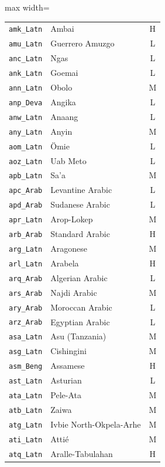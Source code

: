 {\begin{adjustbox}{max width=\textwidth}
\begin{tabular}{llc}
        \texttt{amk\_Latn} & Ambai & H \\
        \texttt{amu\_Latn} & Guerrero Amuzgo & L \\
        \texttt{anc\_Latn} & Ngas & L \\
        \texttt{ank\_Latn} & Goemai & L \\
        \texttt{ann\_Latn} & Obolo & M \\
        \texttt{anp\_Deva} & Angika & L \\
        \texttt{anw\_Latn} & Anaang & L \\
        \texttt{any\_Latn} & Anyin & M \\
        \texttt{aom\_Latn} & Ömie & L \\
        \texttt{aoz\_Latn} & Uab Meto & L \\
        \texttt{apb\_Latn} & Sa'a & M \\
        \texttt{apc\_Arab} & Levantine Arabic & L \\
        \texttt{apd\_Arab} & Sudanese Arabic & L \\
        \texttt{apr\_Latn} & Arop-Lokep & M \\
        \texttt{arb\_Arab} & Standard Arabic & H \\
        \texttt{arg\_Latn} & Aragonese & M \\
        \texttt{arl\_Latn} & Arabela & H \\
        \texttt{arq\_Arab} & Algerian Arabic & L \\
        \texttt{ars\_Arab} & Najdi Arabic & M \\
        \texttt{ary\_Arab} & Moroccan Arabic & L \\
        \texttt{arz\_Arab} & Egyptian Arabic & L \\
        \texttt{asa\_Latn} & Asu (Tanzania) & M \\
        \texttt{asg\_Latn} & Cishingini & M \\
        \texttt{asm\_Beng} & Assamese & H \\
        \texttt{ast\_Latn} & Asturian & L \\
        \texttt{ata\_Latn} & Pele-Ata & M \\
        \texttt{atb\_Latn} & Zaiwa & M \\
        \texttt{atg\_Latn} & Ivbie North-Okpela-Arhe & M \\
        \texttt{ati\_Latn} & Attié & M \\
        \texttt{atq\_Latn} & Aralle-Tabulahan & H \\

\end{tabular}
\end{adjustbox}}
